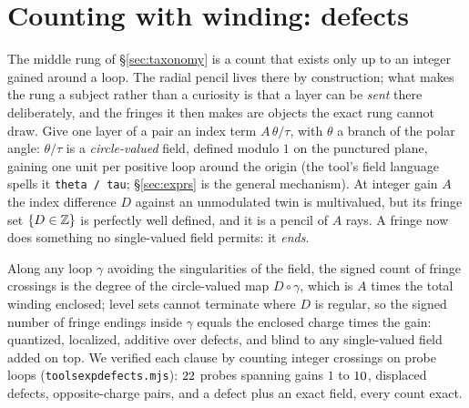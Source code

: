 \section{Counting with winding: defects}
\label{sec:defects}

The middle rung of \S\ref{sec:taxonomy} is a count that exists only up to an
integer gained around a loop. The radial pencil lives there by construction;
what makes the rung a subject rather than a curiosity is that a layer can be
\emph{sent} there deliberately, and the fringes it then makes are objects the
exact rung cannot draw. Give one layer of a pair an index term
$A\,\theta/\tau$, with $\theta$ a branch of the polar angle: $\theta/\tau$ is
a \emph{circle-valued} field, defined modulo $1$ on the punctured plane,
gaining one unit per positive loop around the origin (the tool's field
language spells it \texttt{theta\,/\,tau}; \S\ref{sec:exprs} is the general
mechanism). At integer gain $A$ the index difference $D$ against an
unmodulated twin is multivalued, but its fringe set $\{D\in\mathbb{Z}\}$ is
perfectly well defined, and it is a pencil of $A$ rays. A fringe now does
something no single-valued field permits: it \emph{ends}.

Along any loop $\gamma$ avoiding the singularities of the field, the signed
count of fringe crossings is the degree of the circle-valued map
$D\circ\gamma$, which is $A$ times the total winding enclosed; level sets
cannot terminate where $D$ is regular, so the signed number of fringe endings
inside $\gamma$ equals the enclosed charge times the gain: quantized,
localized, additive over defects, and blind to any single-valued field added
on top. We verified each clause by counting integer crossings on probe loops
(\texttt{tools\pslash exp\pslash defects.mjs}): $22$ probes spanning
gains $1$ to $10$, displaced defects, opposite-charge pairs, and a
defect plus an exact field, every count exact.

